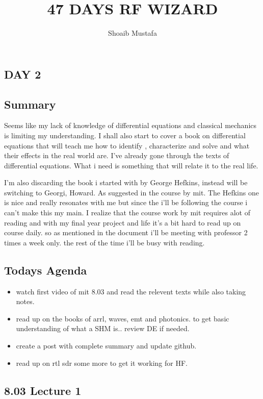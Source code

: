 \documentclass[12pt]{article}
\title{47 DAYS RF WIZARD}
\author{Shoaib Mustafa}
\begin{document}
\maketitle

\begin{center}
    \section*{DAY 2}
\end{center}
\subsection*{Summary}
Seems like my lack of knowledge of differential equations and classical mechanics is limiting my understanding.
I shall also start to cover a book on differential equations that will teach me how to identify
, characterize and solve and what their effects in the real world are. I've already gone through
the texts of differential equations. What i need is something that will relate it to the real life.

I'm also discarding the book i started with by George Hefkins, instead will be switching to Georgi, Howard.
As suggested in the course by mit. The Hefkins one is nice and really resonates with me but since the i'll be following the course i can't make this my main.
I realize that the course work by mit requires alot of reading and with my final year project and life it's a bit hard to read up on course daily. so as mentioned in the document i'll be meeting with professor 
2 times a week only. the rest of the time i'll be busy with reading. 
\subsection*{Todays Agenda}
\begin{itemize}
    \item watch first video of mit 8.03 and read the relevent texts while also taking notes.
    \item read up on the books of arrl, waves, emt and photonics. to get basic understanding of what a SHM is.. review DE if needed.
    \item create a post with complete summary and update github.
    \item read up on rtl sdr some more to get it working for HF.
\end{itemize}

\subsection*{8.03 Lecture 1}
\end{document}
